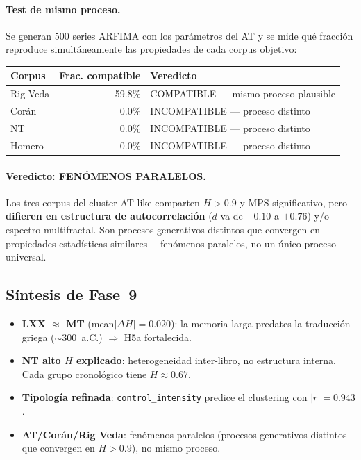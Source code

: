 \documentclass[12pt,a4paper]{article}
\begin{document}
\paragraph{Test de mismo proceso.}
Se generan 500 series ARFIMA con los par\'ametros del AT y se mide qu\'e
fracci\'on reproduce simult\'aneamente las propiedades de cada corpus objetivo:

\begin{center}
\begin{tabular}{lrl}
\toprule
\textbf{Corpus} & \textbf{Frac. compatible} & \textbf{Veredicto} \\
\midrule
Rig Veda  & 59.8\% & COMPATIBLE --- mismo proceso plausible \\
Cor\'an   & 0.0\%  & INCOMPATIBLE --- proceso distinto \\
NT        & 0.0\%  & INCOMPATIBLE --- proceso distinto \\
Homero    & 0.0\%  & INCOMPATIBLE --- proceso distinto \\
\bottomrule
\end{tabular}
\end{center}

\paragraph{Veredicto: FEN\'OMENOS PARALELOS.}
Los tres corpus del cluster AT-like comparten $H > 0.9$ y MPS significativo,
pero \textbf{difieren en estructura de autocorrelaci\'on} ($d$ va de $-0.10$
a $+0.76$) y/o espectro multifractal. Son procesos generativos distintos
que convergen en propiedades estad\'isticas similares ---fen\'omenos paralelos,
no un \'unico proceso universal.


\subsection{S\'intesis de Fase~9}

\begin{itemize}[leftmargin=2em]
\item \textbf{LXX $\approx$ MT} (mean$|\Delta H| = 0.020$): la memoria larga
      predates la traducci\'on griega ($\sim$300~a.C.) $\Rightarrow$ H5a fortalecida.
\item \textbf{NT alto $H$ explicado}: heterogeneidad inter-libro, no estructura
      interna. Cada grupo cronol\'ogico tiene $H \approx 0.67$.
\item \textbf{Tipolog\'ia refinada}: \texttt{control\_intensity} predice el
      clustering con $|r| = 0.943$.
\item \textbf{AT/Cor\'an/Rig Veda}: fen\'omenos paralelos (procesos generativos
      distintos que convergen en $H > 0.9$), no mismo proceso.
\end{itemize}
\end{document}
